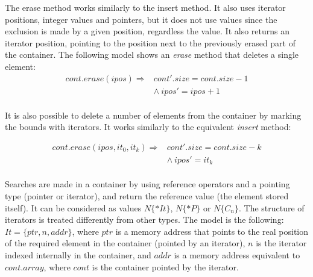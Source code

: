 \documentclass[a4paper]{llncs}
\newcommand{\comment}[1]{}
\begin{document}
The erase method works similarly to the insert method. It also uses iterator
positions, integer values and pointers, but it does not use values since the exclusion
is made by a given position, regardless the value. It also returns an iterator position,
pointing to the position next to the previously erased part of the container.
The following model shows an \textit{erase} method that deletes a single element:
%
\[\begin{array}{ll}
\label{erase1-model}
cont.erase (ipos) \Longrightarrow & cont'.size = cont.size - 1\\
  & \wedge \: ipos' = ipos + 1 \\
\end{array}\]

It is also possible to delete a number of elements from the container by
marking the bounds with iterators. It works similarly to the equivalent
\textit{insert} method:

\[\begin{array}{ll}
\label{erase2-model}
cont.erase (ipos, it_0, it_k) \Longrightarrow & 	cont'.size = cont.size - k\\
  & \wedge \:	ipos' = it_k \\
\end{array}\]

Searches are made in a container by using reference operators
and a pointing type (pointer or iterator), and return the reference
value (the element stored itself). It can be considered as values
$N\{*It\}$, $N\{*P\}$ or $N\{C_n\}$.	The structure of iterators
is treated differently from other types. The model is the following:
$It = \{ ptr, n, addr\}$,
where $ptr$ is a memory address that points to the
real position of the required element in the container
(pointed by an iterator), $n$ is the iterator indexed
internally in the container, and $addr$ is a memory
address equivalent to $cont.array$, where $cont$ is the container
pointed by the iterator.


\comment{
To build the operational model, it is important
to define a class structure that is as close as to the
real implementation so that ESBMC++ can correctly identify
the relationships between classes in a given program and
then introduce such relationships to build the AST.}
\end{document}
